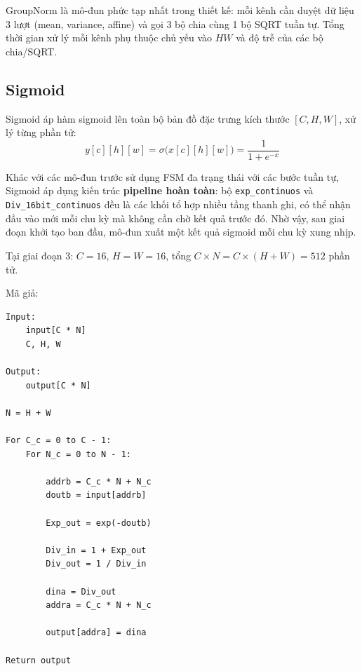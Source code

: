 \documentclass{uetgraduation}
\begin{document}
GroupNorm là mô-đun phức tạp nhất trong thiết kế: mỗi kênh cần duyệt
dữ liệu 3 lượt (mean, variance, affine) và gọi 3 bộ chia cùng 1 bộ
SQRT tuần tự. Tổng thời gian xử lý mỗi kênh phụ thuộc chủ yếu vào
$HW$ và độ trễ của các bộ chia/SQRT.

\subsection{Sigmoid}
Sigmoid áp hàm sigmoid lên toàn bộ bản đồ đặc trưng kích thước
$[C, H, W]$, xử lý từng phần tử:
\begin{equation}
    y[c][h][w] = \sigma\bigl(x[c][h][w]\bigr)
    = \frac{1}{1 + e^{-x}}
\end{equation}

Khác với các mô-đun trước sử dụng FSM đa trạng thái với các bước tuần
tự, Sigmoid áp dụng kiến trúc \textbf{pipeline hoàn toàn}: bộ
\texttt{exp\_continuos} và \texttt{Div\_16bit\_continuos} đều là các
khối tổ hợp nhiều tầng thanh ghi, có thể nhận đầu vào mới mỗi chu kỳ
mà không cần chờ kết quả trước đó. Nhờ vậy, sau giai đoạn khởi tạo
ban đầu, mô-đun xuất một kết quả sigmoid mỗi chu kỳ xung nhịp.

Tại giai đoạn 3: $C = 16$, $H = W = 16$, tổng $C \times N = C \times (H + W)
= 512$ phần tử.

Mã giả:
\begin{Verbatim}[frame=single]
Input:
    input[C * N]
    C, H, W

Output:
    output[C * N]

N = H + W

For C_c = 0 to C - 1:
    For N_c = 0 to N - 1:

        addrb = C_c * N + N_c
        doutb = input[addrb]

        Exp_out = exp(-doutb)

        Div_in = 1 + Exp_out
        Div_out = 1 / Div_in

        dina = Div_out
        addra = C_c * N + N_c

        output[addra] = dina

Return output
\end{Verbatim}
\end{document}
